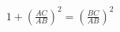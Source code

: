 \documentclass[preview]{standalone}
\begin{document}
\begin{align*}
1 + \left(\frac{AC}{AB}\right)^2 = \left(\frac{BC}{AB}\right)^2
\end{align*}
\end{document}
